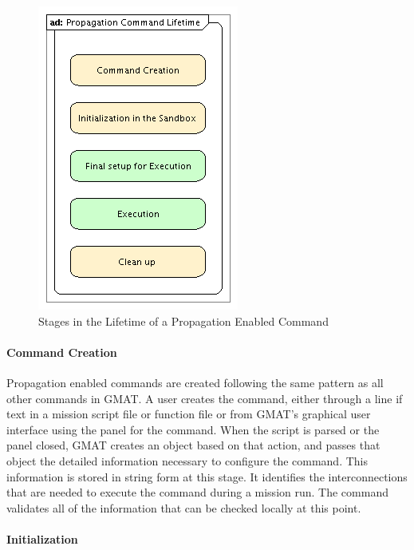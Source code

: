 \documentclass[10pt]{article}
\begin{document}
\begin{figure}[htb]
\begin{center}
\includegraphics[125,190]{Images/PropagationCommandLifetime.png}
\caption{Stages in the Lifetime of a Propagation Enabled Command}
\label{fig:PropLifetime}
\end{center}
\end{figure}

\paragraph{Command Creation}

Propagation enabled commands are created following the same pattern as all other commands in GMAT.  A user creates the command, either through a line if text in a mission script file or function file or from GMAT's graphical user interface using the panel for the command.  When the script is parsed or the panel closed, GMAT creates an object based on that action, and passes that object the detailed information necessary to configure the command.  This information is stored in string form at this stage.  It identifies the interconnections that are needed to execute the command during a mission run.  The command validates all of the information that can be checked locally at this point.

\paragraph{Initialization}
\end{document}
